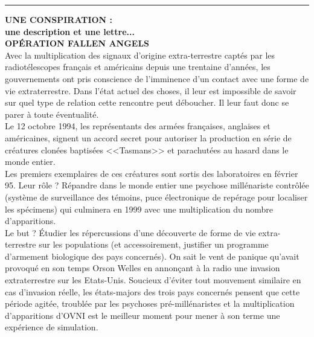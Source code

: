 \documentclass[11pt,twoside,a4paper]{article}
\begin{document}
\begin{multicols*}{2}
\begin{center} \rule{0.45\textwidth}{0.01cm} \end{center}

\vfill
\columnbreak

\vfill

\textbf{\Large UNE CONSPIRATION : ~\\une description et une lettre...}~\\

\textbf{\Large OP{\'E}RATION FALLEN ANGELS}~\\

Avec la multiplication des signaux d'origine extra-terrestre capt{\'e}s par les radiot{\'e}lescopes fran\c{c}ais et am{\'e}ricains depuis une trentaine d'ann{\'e}es, les gouvernements ont pris conscience de l'imminence d'un contact avec une forme de vie extraterrestre. Dans l'{\'e}tat actuel des choses, il leur est impossible de savoir sur quel type de relation cette rencontre peut d{\'e}boucher. Il leur faut donc se parer {\`a} toute {\'e}ventualit{\'e}. ~\\

Le 12 octobre 1994, les repr{\'e}sentants des arm{\'e}es fran\c{c}aises, anglaises et am{\'e}ricaines, signent un accord secret pour autoriser la production en s{\'e}rie de cr{\'e}atures clon{\'e}es baptis{\'e}es <<Tasmans>> et parachut{\'e}es au hasard dans le monde entier. ~\\

Les premiers exemplaires de ces cr{\'e}atures sont sortis des laboratoires en f{\'e}vrier 95. Leur r{\^o}le ? R{\'e}pandre dans le monde entier une psychose mill{\'e}nariste contr{\^o}l{\'e}e (syst{\`e}me de surveillance des t{\'e}moins, puce {\'e}lectronique de rep{\'e}rage pour localiser les sp{\'e}cimens) qui culminera en 1999 avec une multiplication du nombre d'apparitions. ~\\

Le but ? {\'E}tudier les r{\'e}percussions d'une d{\'e}couverte de forme de vie extra-terrestre sur les populations (et accessoirement, justifier un programme d'armement biologique des pays concern{\'e}s). On sait le vent de panique qu'avait provoqu{\'e} en son temps Orson Welles en annon\c{c}ant {\`a} la radio une invasion extraterrestre sur les Etats-Unis. Soucieux d'{\'e}viter tout mouvement similaire en cas d'invasion r{\'e}elle, les {\'e}tats-majors des trois pays concern{\'e}s pensent que cette p{\'e}riode agit{\'e}e, troubl{\'e}e par les psychoses pr{\'e}-mill{\'e}naristes et la multiplication d'apparitions d'OVNI est le meilleur moment pour mener {\`a} son terme une exp{\'e}rience de simulation. ~\\


\end{multicols*}
\end{document}
